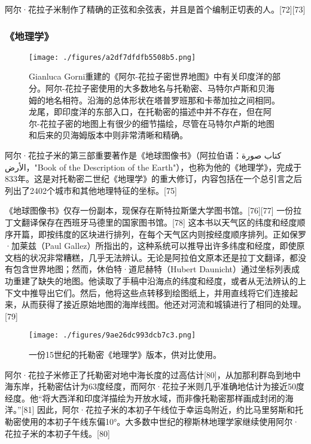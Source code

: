 阿尔·花拉子米制作了精确的正弦和余弦表，并且是首个编制正切表的人。[72][73]
\subsubsection{《地理学》}
\begin{figure}[ht]
\centering
\texttt{[image: ./figures/a2df7dfdfb5508b5.png]}
\caption{Gianluca Gorni重建的《阿尔-花拉子密世界地图》中有关印度洋的部分。阿尔-花拉子密使用的大多数地名与托勒密、马特尔卢斯和贝海姆的地名相符。沿海的总体形状在塔普罗班那和卡蒂加拉之间相同。龙尾，即印度洋的东部入口，在托勒密的描述中并不存在，但在阿尔-花拉子密的地图上有很少的细节描绘，尽管在马特尔卢斯的地图和后来的贝海姆版本中则非常清晰和精确。} \label{fig_HLZM_9}
\end{figure}
阿尔·花拉子米的第三部重要著作是《地球图像书》（阿拉伯语：كتاب صورة الأرض，"Book of the Description of the Earth"），也称为他的《地理学》，完成于833年。这是对托勒密二世纪《地理学》的重大修订，内容包括在一个总引言之后列出了2402个城市和其他地理特征的坐标。[75]

《地球图像书》仅存一份副本，现保存在斯特拉斯堡大学图书馆。[76][77] 一份拉丁文翻译保存在西班牙马德里的国家图书馆。[78] 这本书以天气区的纬度和经度顺序开篇，即按纬度的区块进行排列，在每个天气区内则按经度顺序排列。正如保罗·加莱兹（Paul Gallez）所指出的，这种系统可以推导出许多纬度和经度，即使原文档的状况非常糟糕，几乎无法辨认。无论是阿拉伯文原本还是拉丁文翻译，都没有包含世界地图；然而，休伯特·道尼赫特（Hubert Daunicht）通过坐标列表成功重建了缺失的地图。他读取了手稿中沿海点的纬度和经度，或者从无法辨认的上下文中推导出它们。然后，他将这些点转移到绘图纸上，并用直线将它们连接起来，从而获得了接近原始地图的海岸线图。他还对河流和城镇进行了相同的处理。[79]
\begin{figure}[ht]
\centering
\texttt{[image: ./figures/9ae26dc993dcb7c3.png]}
\caption{一份15世纪的托勒密《地理学》版本，供对比使用。} \label{fig_HLZM_10}
\end{figure}
阿尔·花拉子米修正了托勒密对地中海长度的过高估计[80]，从加那利群岛到地中海东岸，托勒密估计为63度经度，而阿尔·花拉子米则几乎准确地估计为接近50度经度。他“将大西洋和印度洋描绘为开放水域，而非像托勒密那样画成封闭的海洋。”[81] 因此，阿尔·花拉子米的本初子午线位于幸运岛附近，约比马里努斯和托勒密使用的本初子午线东偏10°。大多数中世纪的穆斯林地理学家继续使用阿尔·花拉子米的本初子午线。[80]